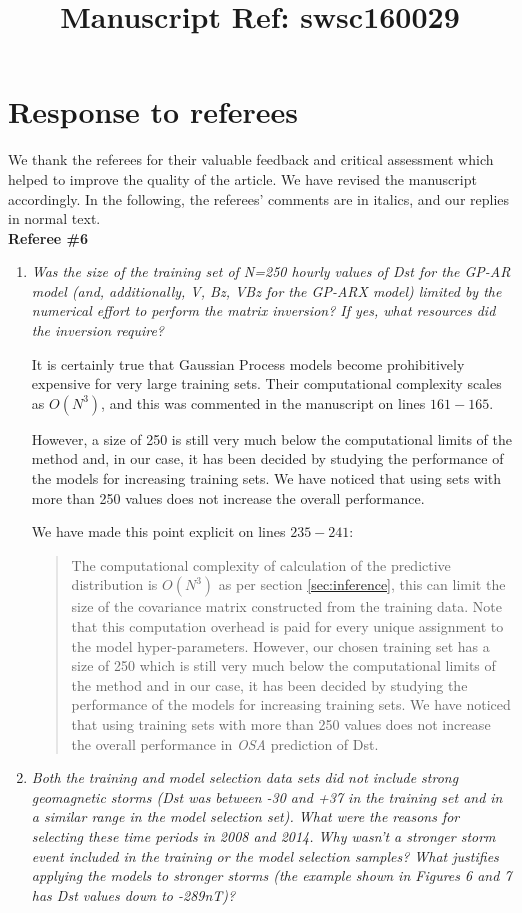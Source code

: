 \documentclass{article}
\begin{document}
\title{Manuscript Ref: swsc160029}
\maketitle

\section*{Response to referees}
We thank the referees for their valuable feedback and critical assessment which helped to improve the quality of the article. We have revised the manuscript accordingly. In the following, the referees' comments are in italics, and our replies in normal text.\\

\textbf{Referee \#6}
\begin{enumerate}
\item \emph{Was the size of the training set of N=250 hourly values of Dst for the GP-AR model (and, additionally, V, Bz, VBz for the GP-ARX model) limited by the numerical effort to perform the matrix inversion? If yes, what resources did the inversion require?}

It is certainly true that Gaussian Process models become prohibitively expensive for very large training sets. Their computational complexity scales as $O(N^3)$, and this was commented in the manuscript on lines $161-165$.

However, a size of 250 is still very much below the computational limits of the method and, in our case, it has been decided by studying the performance of the models for increasing training sets. We have noticed that using sets with more than 250 values does not increase the overall performance.

We have made this point explicit on lines $235-241$: \blockquote{The computational complexity of calculation of the predictive distribution is $O(N^3)$ as per section \ref{sec:inference}, this can limit the size of the covariance matrix constructed from the training data. Note that this computation overhead is paid for every unique assignment to the model hyper-parameters. However, our chosen training set has a size of 250 which is still very much below the computational limits of the method and in our case, it has been decided by studying the performance of the models for increasing training sets. We have noticed that using training sets with more than 250 values does not increase the overall performance in \emph{OSA} prediction of Dst.
}

\newpage
\item \emph{Both the training and model selection data sets did not include strong geomagnetic storms (Dst was between -30 and +37 in the training set and in a similar range in the model selection set).
What were the reasons for selecting these time periods in 2008 and 2014.
Why wasn't a stronger storm event included in the training or the model selection samples?
What justifies applying the models to stronger storms (the example shown in Figures 6 and 7 has Dst values down to -289nT)?} 


\end{enumerate}
\end{document}
